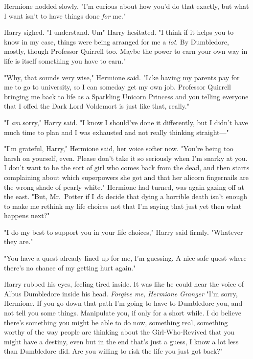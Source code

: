 Hermione nodded slowly. "I'm curious about how you'd do that exactly, but what
I want isn't to have things done \emph{for} me."

Harry sighed. "I understand. Um{\el}" Harry hesitated. "I think{\el} if
it helps you to know{\el} in my case, things were being arranged for me a
\emph{lot}. By Dumbledore, mostly, though Professor Quirrell too. Maybe the
power to earn your own way in life is itself something you have to earn."

"Why, that sounds very wise," Hermione said. "Like having my parents pay for me
to go to university, so I can someday get my own job. Professor Quirrell
bringing me back to life as a Sparkling Unicorn Princess and you telling
everyone that I offed the Dark Lord Voldemort is just like that, really."

"I \emph{am} sorry," Harry said. "I know I should've done it differently,
but{\el} I didn't have much time to plan and I was exhausted and not really
thinking straight—"

"I'm grateful, Harry," Hermione said, her voice softer now. "You're being too
harsh on yourself, even. Please don't take it so seriously when I'm snarky at
you. I don't want to be the sort of girl who comes back from the dead, and then
starts complaining about which superpowers she got and that her alicorn
fingernails are the wrong shade of pearly white." Hermione had turned, was
again gazing off at the east. "But, Mr.~Potter{\el} if I \emph{do} decide
that dying a horrible death isn't enough to make me rethink my life
choices{\el} not that I'm saying that just yet{\el} then what happens
next?"

"I do my best to support you in your life choices," Harry said firmly.
"Whatever they are."

"You have a quest already lined up for me, I'm guessing. A nice safe quest
where there's no chance of my getting hurt again."

Harry rubbed his eyes, feeling tired inside. It was like he could hear the
voice of Albus Dumbledore inside his head. \emph{Forgive me, Hermione
Granger{\el}} "I'm sorry, Hermione. If you go down that path I'm going to
have to Dumbledore you, and not tell you some things. Manipulate you, if only
for a short while. I do believe there's something you might be able to do now,
something real, something worthy of the way people are thinking about the
Girl-Who-Revived{\el} that you might have a destiny, even{\el} but in the
end that's just a guess, I know a lot less than Dumbledore did. Are you willing
to risk the life you just got back?"

